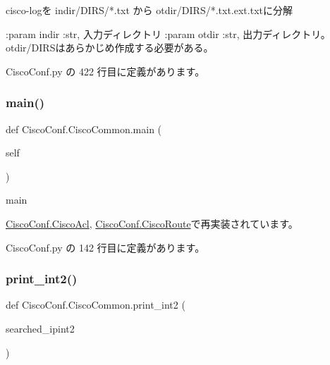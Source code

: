 \begin{DoxyVerb}cisco-logを indir/DIRS/*.txt から otdir/DIRS/*.txt.ext.txtに分解

:param indir :str, 入力ディレクトリ
:param otdir :str, 出力ディレクトリ。otdir/DIRSはあらかじめ作成する必要がある。
\end{DoxyVerb}
 

 Cisco\+Conf.\+py の 422 行目に定義があります。

\mbox{\label{classCiscoConf_1_1CiscoCommon_a1bfe0207baec9f926f5dbea8c0f9e503}} 
\subsubsection{\texorpdfstring{main()}{main()}}
{\footnotesize\ttfamily def Cisco\+Conf.\+Cisco\+Common.\+main (\begin{DoxyParamCaption}\item[{}]{self }\end{DoxyParamCaption})}

\begin{DoxyVerb}main
\end{DoxyVerb}
 

\mbox{\hyperlink{classCiscoConf_1_1CiscoAcl_a3865990e7ffb488c97717b01f8a37fb8}{Cisco\+Conf.\+Cisco\+Acl}}, \mbox{\hyperlink{classCiscoConf_1_1CiscoRoute_ae6779b3141da097bbba9ca2b15b07481}{Cisco\+Conf.\+Cisco\+Route}}で再実装されています。



 Cisco\+Conf.\+py の 142 行目に定義があります。

\mbox{\label{classCiscoConf_1_1CiscoCommon_af1925c9fc6e13cb0d77746440bec1249}} 
\subsubsection{\texorpdfstring{print\_int2()}{print\_int2()}}
{\footnotesize\ttfamily def Cisco\+Conf.\+Cisco\+Common.\+print\+\_\+int2 (\begin{DoxyParamCaption}\item[{}]{searched\+\_\+ipint2 }\end{DoxyParamCaption})\hspace{0.3cm}{\ttfamily [static]}}


